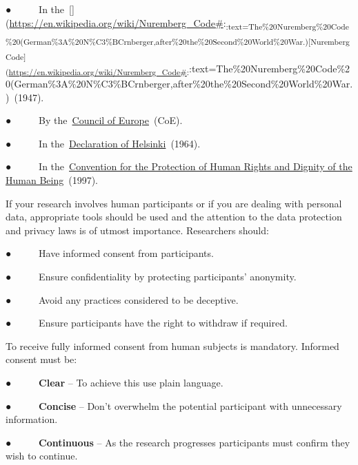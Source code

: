 \documentclass[
]{book}
\begin{document}
● ~ ~ ~ In the~{[}{]}(\url{https://en.wikipedia.org/wiki/Nuremberg_Code\#}:\textsubscript{:text=The\%20Nuremberg\%20Code\%20(German\%3A\%20N\%C3\%BCrnberger,after\%20the\%20Second\%20World\%20War.){[}Nuremberg Code{]}(\url{https://en.wikipedia.org/wiki/Nuremberg_Code\#}:}:text=The\%20Nuremberg\%20Code\%20(German\%3A\%20N\%C3\%BCrnberger,after\%20the\%20Second\%20World\%20War.)~(1947).

● ~ ~ ~ By the~\href{https://www.coe.int/en/web/portal}{}\href{https://www.coe.int/en/web/portal}{Council of Europe}~(CoE).

● ~ ~ ~ In the~\href{https://www.wma.net/policies-post/wma-declaration-of-helsinki-ethical-principles-for-medical-research-involving-human-subjects/\#:~:text=1.,identifiable\%20human\%20material\%20and\%20data.}{}\href{https://www.wma.net/policies-post/wma-declaration-of-helsinki-ethical-principles-for-medical-research-involving-human-subjects/\#:~:text=1.,identifiable\%20human\%20material\%20and\%20data.}{Declaration of Helsinki}~(1964).

● ~ ~ ~ In the~\href{https://docs.google.com/document/u/0/d/1oUTVCqSzDajLWZAlSkFwHX8XZrolNDDayX1I3OtkzRs/edit}{}\href{https://docs.google.com/document/u/0/d/1oUTVCqSzDajLWZAlSkFwHX8XZrolNDDayX1I3OtkzRs/edit}{Convention for the Protection of Human Rights and Dignity of the Human Being}~(1997).

If your research involves human participants or if you are dealing with personal data, appropriate tools should be used and the attention to the data protection and privacy laws is of utmost importance. Researchers should:

● ~ ~ ~ Have informed consent from participants.

● ~ ~ ~ Ensure confidentiality by protecting participants' anonymity.

● ~ ~ ~ Avoid any practices considered to be deceptive.

● ~ ~ ~ Ensure participants have the right to withdraw if required.

To receive fully informed consent from human subjects is mandatory. Informed consent must be:

● ~ ~ ~ \textbf{Clear} -- To achieve this use plain language.

● ~ ~ ~ \textbf{Concise} -- Don't overwhelm the potential participant with unnecessary information.

● ~ ~ ~ \textbf{Continuous} -- As the research progresses participants must confirm they wish to continue.
\end{document}
